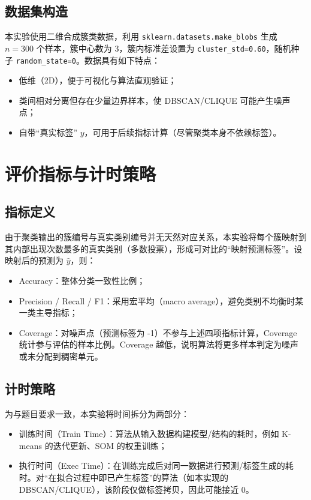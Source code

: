 \documentclass[runningheads]{ctexart}
\begin{document}
\subsection{数据集构造}
本实验使用二维合成簇类数据，利用 \texttt{sklearn.datasets.make\_blobs} 生成 $n=300$ 个样本，簇中心数为 3，簇内标准差设置为 \texttt{cluster\_std=0.60}，随机种子 \texttt{random\_state=0}。数据具有如下特点：
\begin{itemize}
	\item 低维（2D），便于可视化与算法直观验证；
	\item 类间相对分离但存在少量边界样本，使 DBSCAN/CLIQUE 可能产生噪声点；
	\item 自带“真实标签” $y$，可用于后续指标计算（尽管聚类本身不依赖标签）。
\end{itemize}

\section{评价指标与计时策略}
\subsection{指标定义}
由于聚类输出的簇编号与真实类别编号并无天然对应关系，本实验将每个簇映射到其内部出现次数最多的真实类别（多数投票），形成可对比的“映射预测标签”。设映射后的预测为 $\hat{y}$，则：
\begin{itemize}
	\item Accuracy：整体分类一致性比例；
	\item Precision / Recall / F1：采用宏平均（macro average），避免类别不均衡时某一类主导指标；
	\item Coverage：对噪声点（预测标签为 -1）不参与上述四项指标计算，Coverage 统计参与评估的样本比例。Coverage 越低，说明算法将更多样本判定为噪声或未分配到稠密单元。
\end{itemize}

\subsection{计时策略}
为与题目要求一致，本实验将时间拆分为两部分：
\begin{itemize}
	\item 训练时间（Train Time）：算法从输入数据构建模型/结构的耗时，例如 K-means 的迭代更新、SOM 的权重训练；
	\item 执行时间（Exec Time）：在训练完成后对同一数据进行预测/标签生成的耗时。对“在拟合过程中即已产生标签”的算法（如本实现的 DBSCAN/CLIQUE），该阶段仅做标签拷贝，因此可能接近 0。
\end{itemize}
\end{document}
